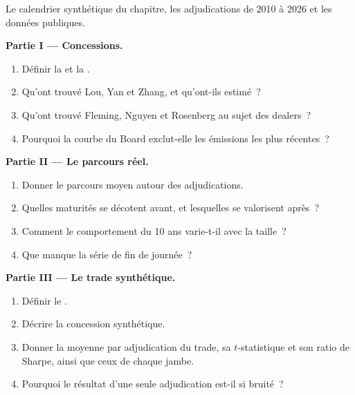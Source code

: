 \begin{problem}\label{pb:s2:supply-trades:1}
Le calendrier synthétique du chapitre, les adjudications de 2010 à 2026 et les données publiques.

\medskip\noindent\textbf{Partie I --- Concessions.}
\begin{enumerate}
\item Définir la  et la .
\item Qu'ont trouvé Lou, Yan et Zhang, et qu'ont-ils estimé~?
\item Qu'ont trouvé Fleming, Nguyen et Rosenberg au sujet des dealers~?
\item Pourquoi la courbe du Board exclut-elle les émissions les plus récentes~?
\end{enumerate}

\medskip\noindent\textbf{Partie II --- Le parcours réel.}
\begin{enumerate}[resume]
\item Donner le parcours moyen autour des adjudications.
\item Quelles maturités se décotent avant, et lesquelles se valorisent après~?
\item Comment le comportement du 10 ans varie-t-il avec la taille~?
\item Que manque la série de fin de journée~?
\end{enumerate}

\medskip\noindent\textbf{Partie III --- Le trade synthétique.}
\begin{enumerate}[resume]
\item Définir le .
\item Décrire la concession synthétique.
\item Donner la moyenne par adjudication du trade, sa $t$-statistique et son ratio de Sharpe, ainsi que ceux de chaque jambe.
\item Pourquoi le résultat d'une seule adjudication est-il si bruité~?
\end{enumerate}


\end{problem}
